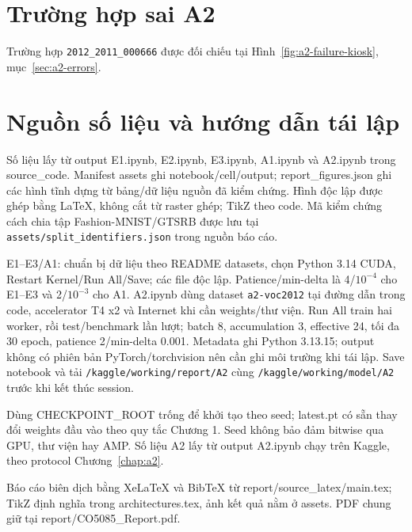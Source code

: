 \Needspace{.92\textheight}
\section{Trường hợp sai A2}
Trường hợp \texttt{2012\_2011\_000666} được đối chiếu tại
Hình~\ref{fig:a2-failure-kiosk}, mục~\ref{sec:a2-errors}.

\section{Nguồn số liệu và hướng dẫn tái lập}
Số liệu lấy từ output E1.ipynb, E2.ipynb, E3.ipynb, A1.ipynb và
A2.ipynb trong source\_code. Manifest assets ghi notebook/cell/output;
report\_figures.json ghi các hình tĩnh dựng từ bảng/dữ liệu nguồn đã kiểm chứng.
Hình độc lập được ghép bằng LaTeX, không cắt từ raster ghép; TikZ theo code.
Mã kiểm chứng cách chia tập Fashion-MNIST/GTSRB được lưu tại
\texttt{assets/split\_identifiers.json} trong nguồn báo cáo.

E1--E3/A1: chuẩn bị dữ liệu theo README datasets, chọn Python 3.14 CUDA,
Restart Kernel/Run All/Save; các file độc lập. Patience/min-delta là
4/$10^{-4}$ cho E1--E3 và 2/$10^{-3}$ cho A1.
A2.ipynb dùng dataset \texttt{a2-voc2012} tại đường dẫn trong code,
accelerator T4 x2 và Internet khi cần weights/thư viện. Run All train hai
worker, rồi test/benchmark lần lượt; batch 8, accumulation 3, effective 24,
tối đa 30 epoch, patience 2/min-delta 0.001. Metadata ghi Python 3.13.15;
output không có phiên bản PyTorch/torchvision nên cần ghi môi trường khi tái lập.
Save notebook và tải \texttt{/kaggle/working/report/A2} cùng
\texttt{/kaggle/working/model/A2} trước khi kết thúc session.

Dùng CHECKPOINT\_ROOT trống để khởi tạo theo seed; latest.pt có sẵn thay đổi
weights đầu vào theo quy tắc Chương 1. Seed không bảo đảm bitwise qua GPU,
thư viện hay AMP. Số liệu A2 lấy từ output A2.ipynb chạy trên Kaggle,
theo protocol Chương~\ref{chap:a2}.

Báo cáo biên dịch bằng XeLaTeX và BibTeX từ report/source\_latex/main.tex;
TikZ định nghĩa trong architectures.tex, ảnh kết quả nằm ở assets.
PDF chung giữ tại report/CO5085\_Report.pdf.
